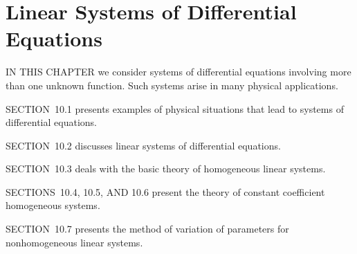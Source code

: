 \chapter{Linear Systems of Differential Equations}

\noindent
IN THIS CHAPTER we consider systems of differential equations involving more than one unknown function. Such systems arise in many physical applications.

\medskip
\noindent
SECTION~10.1 presents examples of physical situations that lead to systems of differential equations.

\medskip
\noindent
SECTION~10.2 discusses linear systems of differential equations.

\medskip
\noindent
SECTION~10.3 deals with the basic theory of homogeneous linear systems.

\medskip
\noindent
SECTIONS~10.4, 10.5, AND 10.6 present the theory of constant coefficient homogeneous systems.

\medskip
\noindent
SECTION~10.7 presents the method of variation of parameters for nonhomogeneous linear systems.

\newpage














